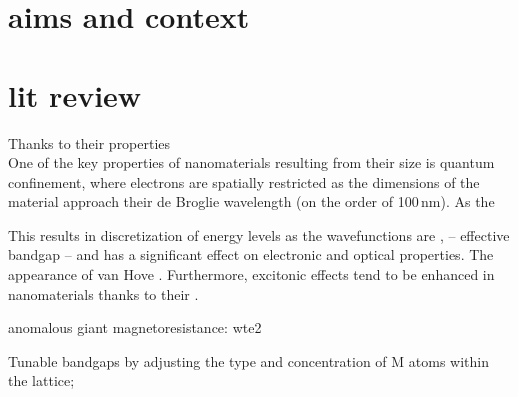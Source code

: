 \chapter{aims and context}


\chapter{lit review}


Thanks to their properties  \\ 
One of the key properties of nanomaterials resulting from their size is quantum confinement, where electrons are spatially restricted as the dimensions of the material approach their de Broglie wavelength (on the order of 100\,nm). As the 

This results in discretization of energy levels as the wavefunctions are , -- effective bandgap --  and has a significant effect on electronic and optical properties. The appearance of van Hove . Furthermore, excitonic effects tend to be enhanced in nanomaterials thanks to their . 

anomalous giant magnetoresistance: wte2


Tunable bandgaps by adjusting the type and concentration of M atoms within the lattice; 

